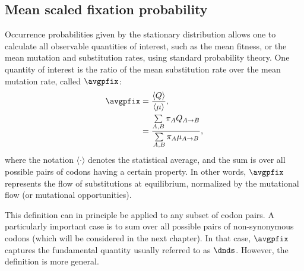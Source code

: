 \subsection{Mean scaled fixation probability}
\label{subsec:mean-scaled-fixation-probability}

Occurrence probabilities given by the stationary distribution allows one to calculate all observable quantities of interest, such as the mean fitness, or the mean mutation and substitution rates, using standard probability theory.
One quantity of interest is the ratio of the mean substitution rate over the mean mutation rate, called $ \avgpfix $:
\begin{align}
    \avgpfix & = \dfrac{ \langle Q \rangle }{\langle \mu \rangle},
    \label{eq:relative-sub-rate} \\
    & = \dfrac{ \sum\limits_{A, B} \pi_{A} Q_{A \to B}}{\sum\limits_{A, B} \pi_{A} \mu_{A \to B}},
\end{align}
where the notation $\langle \cdot \rangle$ denotes the statistical average, and the sum is over all possible pairs of codons having a certain property.
In other words, $\avgpfix$ represents the flow of substitutions at equilibrium, normalized by the mutational flow (or mutational opportunities).

This definition can in principle be applied to any subset of codon pairs.
A particularly important case is to sum over all possible pairs of non-synonymous codons (which will be considered in the next chapter).
In that case, $\avgpfix$ captures the fundamental quantity usually referred to as $\dnds$.
However, the definition is more general.

